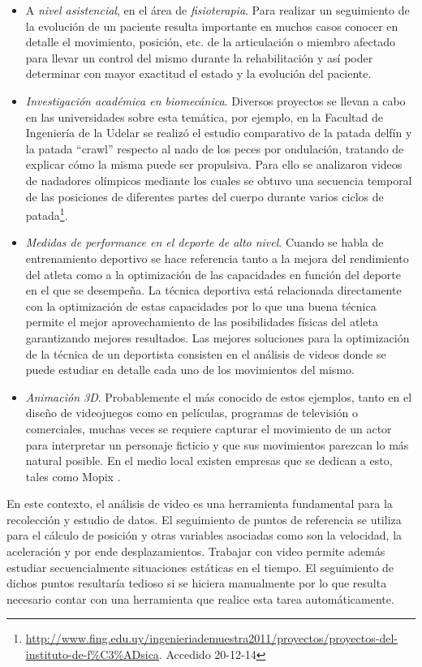 \begin{itemize}
\item A \emph{nivel asistencial}, en el área de \emph{fisioterapia}. Para realizar un seguimiento de la evolución de un paciente resulta importante en muchos casos conocer en detalle el movimiento, posición, etc. de la articulación o miembro afectado para llevar un control del mismo durante la rehabilitación y así poder determinar con mayor exactitud el estado y la evolución del paciente.
\item \emph{Investigación académica en biomecánica}. Diversos proyectos se llevan a cabo en las universidades sobre esta temática, por ejemplo, en la Facultad de Ingeniería de la Udelar  se realizó el estudio comparativo de la patada delfín y la patada “crawl” respecto al nado de los peces por ondulación, tratando de explicar cómo la misma puede ser propulsiva. Para ello se analizaron videos de nadadores olímpicos mediante los cuales se obtuvo una secuencia temporal de las posiciones de diferentes partes del cuerpo durante varios ciclos de patada\footnote{\textcolor{blue}{\scriptsize{\underline{\url{ http://www.fing.edu.uy/ingenieriademuestra2011/proyectos/proyectos-del-instituto-de-f\%C3\%ADsica}}}}. Accedido 20-12-14}.
\item \emph{Medidas de performance en el deporte de alto nivel}. Cuando se habla de entrenamiento deportivo se hace referencia tanto a la mejora del rendimiento del atleta como a la optimización de las capacidades en función del deporte en el que se desempeña. La técnica deportiva está relacionada directamente con la optimización de estas capacidades por lo que una buena técnica permite el mejor aprovechamiento de las posibilidades físicas del atleta garantizando mejores resultados. Las mejores soluciones para la optimización de la técnica de un deportista consisten en el análisis de videos donde se puede estudiar en detalle cada uno de los movimientos del  mismo.
\item \emph{Animación 3D}. Probablemente el más conocido de estos ejemplos, tanto en el diseño de videojuegos como en películas, programas de televisión o comerciales, muchas veces se requiere capturar el movimiento de un actor para interpretar un personaje ficticio y que sus movimientos parezcan lo más natural posible. En el medio local existen empresas que se dedican a esto, tales como Mopix \cite{mopix}.
\end{itemize}

En este contexto, el análisis de video  es  una  herramienta  fundamental para la recolección y estudio de datos. El seguimiento de puntos de referencia se utiliza para el cálculo de posición y otras variables asociadas como son la velocidad, la aceleración y por ende desplazamientos. Trabajar con video permite además estudiar secuencialmente situaciones estáticas en el tiempo. El seguimiento de dichos puntos resultaría tedioso si se hiciera manualmente por lo que resulta necesario contar con una herramienta que realice esta tarea automáticamente.
\\ 

